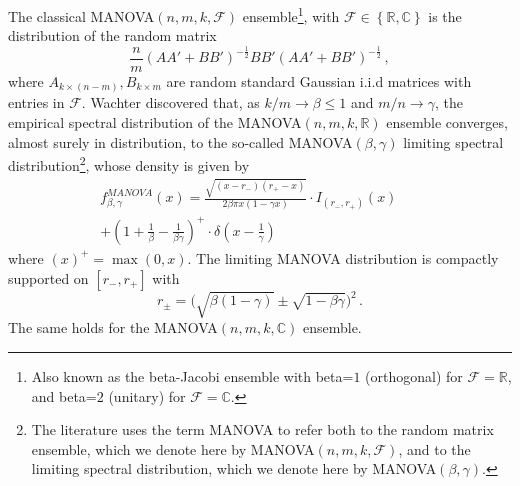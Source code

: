 \documentclass[a4paper,12pt]{article}
\newcommand{\TODO}[1]{ {\tt \color{red} [TODO:#1] } }
\newcommand{\comm}[1]{ {\tt \color{blue} [Comment:#1] } }
\newcommand\x{\times}
\newcommand{\R}{\ensuremath{\mathbb{R}}}
\newcommand{\C}{\ensuremath{\mathbb{C}}}
\newcommand{\Fc}{\ensuremath{\mathcal{F}}}
\newcommand{\m}{m}
\begin{document}
\begin{enumerate}

%
The classical MANOVA$(n,\m,k,\Fc)$ ensemble\footnote{Also known as the
beta-Jacobi ensemble with beta=$1$ (orthogonal) 
for $\Fc=\R$, and beta=$2$ (unitary) for $\Fc=\C$.}, with $\Fc\in\left\{ \R,\C
\right\}$ is the distribution of the random 
matrix 
\begin{equation}
\label{ManovaRandomMatrix}
\frac{n}{\m}(AA'+BB')^{-\frac{1}{2}}BB'(AA'+BB')^{-\frac{1}{2}}\,,
\end{equation} 
where $A_{k\x (n-\m)}, B_{k\x \m}$ are random standard Gaussian
%
i.i.d matrices with entries in $\Fc$.  
Wachter \cite{wachter} discovered that, as $k/\m\to \beta \le 1$ and $\m/n\to\gamma$, 
the empirical spectral
distribution of the MANOVA$(n,\m,k,\R)$ ensemble converges, almost surely in distribution,
to the so-called
MANOVA$(\beta,\gamma)$ limiting
spectral distribution\footnote{The literature uses the term MANOVA to refer both
	to the random matrix ensemble, which we denote here by MANOVA$(n,\m,k,\Fc)$,
	and to the limiting spectral distribution, which we denote here by
MANOVA$(\beta,\gamma)$.}, whose density is given by 
%
\begin{eqnarray}
\label{ManovaDensity}
f_{\beta,\gamma}^{MANOVA}(x)
 =\frac{\sqrt{(x-r_-)(r_+-x)}}{2\beta\pi x(1-\gamma x)}\cdot
I_{(r_-,r_+)}(x) & & \\
   + \left(1+\frac{1}{\beta}-\frac{1}{\beta\gamma}\right)^+ \cdot \delta\left(x-\frac{1}{\gamma}\right) \, &&
   \nonumber
\end{eqnarray}
where $(x)^+ = \max(0,x)$.
The limiting MANOVA distribution is compactly supported on $[r_-,r_+]$  with
\begin{equation}
\label{ManovaDensityExtrimalValues}
r_\pm=\bigg(\sqrt{\beta(1-\gamma)}\pm\sqrt{1-\beta\gamma}\bigg)^2\,.
\end{equation} 
\noindent The same holds for the MANOVA$(n,\m,k,\C)$ ensemble. 


\end{enumerate}
\end{document}
